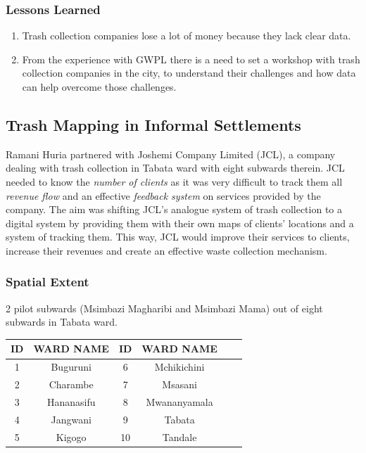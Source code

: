 \documentclass[a4paper,12pt,twoside]{article}
\begin{document}
\subsubsection{Lessons Learned}
\begin{enumerate}
    \item Trash collection companies lose a lot of money because they lack clear data.

    \item From the experience with GWPL there is a need to set a workshop with trash collection companies in the city, to understand their challenges and how data can help overcome those challenges.
\end{enumerate}

\newpage
\subsection{Trash Mapping in Informal Settlements}

Ramani Huria partnered with Joshemi Company Limited (JCL), a company  dealing with trash collection in Tabata ward with eight subwards therein. JCL needed to know the \textit{number of clients} as it was very difficult to track them all \textit{revenue flow} and an effective \textit{feedback system} on services provided by the company. The aim was shifting JCL’s analogue system of trash collection to a digital system by providing them with their own maps of clients’ locations and a system of tracking them. This way, JCL would improve their services to clients, increase their revenues and create an effective waste collection mechanism.

\subsubsection {Spatial Extent}
2 pilot subwards (Msimbazi Magharibi and Msimbazi Mama) out of eight subwards in Tabata ward.

\begin{center}
\begin{tabular}{|c|c|c|c|c|c|}
\hline
ID & WARD NAME & ID & WARD NAME\\
\hline
1  & Buguruni & 6  & Mchikichini\\
2 &  Charambe & 7  & Msasani\\
3  & Hananasifu & 8  & Mwananyamala\\
4  & Jangwani & 9  & Tabata\\
5  & Kigogo & 10  & Tandale\\
 \hline
\end{tabular}
\end{center}
\end{document}
